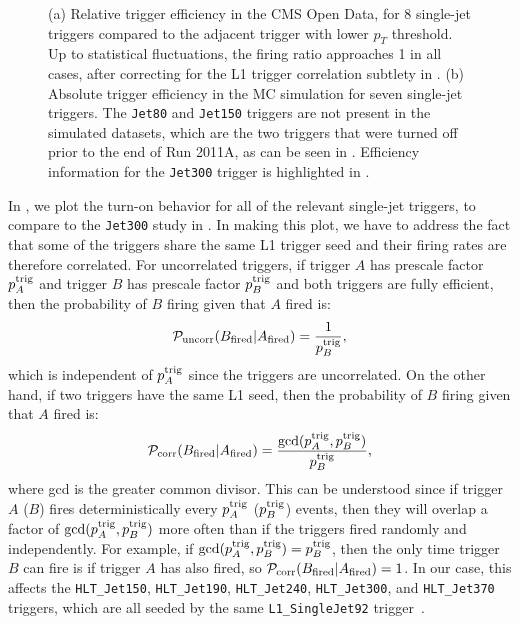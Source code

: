 \documentclass[aps,prd,twocolumn,preprintnumbers,nofootinbib,longbibliography,floatfix,superscriptaddress]{revtex4-1}
\begin{document}
\begin{figure*}[t]
\centering
  \caption{(a) Relative trigger efficiency in the CMS Open Data, for 8 single-jet triggers compared to the adjacent trigger with lower $p_T$ threshold.
  Up to statistical fluctuations, the firing ratio approaches 1 in all cases, after correcting for the L1 trigger correlation subtlety in .
  (b) Absolute trigger efficiency in the MC simulation for seven single-jet triggers.
  The \texttt{Jet80} and \texttt{Jet150} triggers are not present in the simulated datasets, which are the two triggers that were turned off prior to the end of Run 2011A, as can be seen in .
  Efficiency information for the \texttt{Jet300} trigger is highlighted in .
  }
\label{fig:trigger_turn_on_all_triggers}
\end{figure*}


In , we plot the turn-on behavior for all of the relevant single-jet triggers, to compare to the \texttt{Jet300} study in .
%
In making this plot, we have to address the fact that some of the triggers share the same L1 trigger seed and their firing rates are therefore correlated.
%
For uncorrelated triggers, if trigger $A$ has prescale factor $p^{\rm trig}_A$ and trigger $B$ has prescale factor $p^{\rm trig}_B$ and both triggers are fully efficient, then the probability of $B$ firing given that $A$ fired is:
\begin{equation}
\mathcal{P}_{\rm uncorr}(B_{\rm fired} | A_{\rm fired}) = \frac{1}{p^{\rm trig}_B},
\end{equation}
which is independent of $p^{\rm trig}_A$ since the triggers are uncorrelated.
%
On the other hand, if two triggers have the same L1 seed, then the probability of $B$ firing given that $A$ fired is:
\begin{equation}
\label{eq:L1triggerissue}
\mathcal{P}_{\rm corr}(B_{\rm fired} | A_{\rm fired}) = \frac{\text{gcd}(p^{\rm trig}_A,p^{\rm trig}_B)}{p^{\rm trig}_B},
\end{equation}
where gcd is the greater common divisor.
%
This can be understood since if trigger $A$ ($B$) fires deterministically every $p^{\rm trig}_A$ ($p^{\rm trig}_B$) events, then they will overlap a factor of $\text{gcd}(p^{\rm trig}_A,p^{\rm trig}_B)$ more often than if the triggers fired randomly and independently.
%
For example, if $\text{gcd}(p^{\rm trig}_A,p^{\rm trig}_B) = p^{\rm trig}_B$, then the only time trigger $B$ can fire is if trigger $A$ has also fired, so $\mathcal{P}_{\rm corr}(B_{\rm fired} | A_{\rm fired}) = 1$.
%
In our case, this affects the \texttt{HLT\_Jet150}, \texttt{HLT\_Jet190}, \texttt{HLT\_Jet240}, \texttt{HLT\_Jet300}, and \texttt{HLT\_Jet370} triggers, which are all seeded by the same \texttt{L1\_SingleJet92} trigger~\cite{CMS:JetPrimary2011A}.
\end{document}
